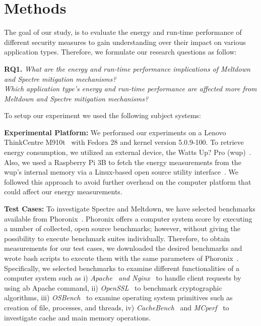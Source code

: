 \documentclass[sigconf, screen]{acmart}
\begin{document}
\section{Methods}
The goal of our study, is to evaluate the energy and run-time performance
of different security measures to gain understanding over their impact
on various application types.
Therefore, we formulate our research questions as follow:

{\bf RQ1.} {\it What are the energy and run-time performance
implications of Meltdown and Spectre mitigation mechanisms?}\\
 {\it Which application type's energy and run-time performance
	are affected more from Meltdown and Spectre mitigation mechanisms?}

To setup our experiment we used the following subject systems:

{\bf Experimental Platform:}
We performed our experiments on a Lenovo ThinkCentre M910t~\cite{lenovo_thinkcentre}
with Fedora 28 and kernel version 5.0.9-100.
To retrieve energy consumption, we utilized an external device, 
the Watts Up? Pro ({\sc wup})~\cite{watts_up_pro}. 
Also, we used a Raspberry Pi 3B to fetch the energy measurements
from the {\sc wup}'s internal memory via a Linux-based open source utility 
interface~\cite{bailey_watts-up:_2017}. 
We followed this approach to avoid further overhead 
on the computer platform that could affect our energy measurements.

{\bf Test Cases:}
To investigate Spectre and Meltdown, we have selected benchmarks
available from Phoronix~\cite{phoronix_suite}.
Phoronix offers a computer system score by executing
a number of collected, open source benchmarks; however,
without giving the possibility to execute benchmark suites individually.
Therefore, to obtain measurements for our test cases,
we downloaded the desired benchmarks and wrote {\sc bash}
scripts to execute them with the same parameters of Phoronix~\cite{phoronix_github}.
Specifically, we selected benchmarks to examine different functionalities
of a computer system such as
i) {\it Apache~\cite{phoronix_apache} and Nginx~\cite{phoronix_nginx}}
to handle client requests by using {\sc ab} Apache command,
ii) {\it OpenSSL}~\cite{phoronix_openssl} to benchmark cryptographic algorithms,
iii) {\it OSBench}~\cite{phoronix_osbench} to examine operating system primitives such as
creation of file, processes, and threads,
iv) {\it CacheBench}~\cite{phoronix_llcbench} and {\it MCperf}~\cite{phoronix_mcperf}
to investigate cache and main memory operations.
\end{document}
